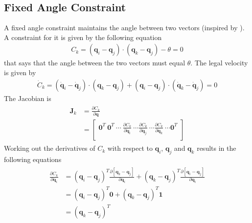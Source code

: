 \subsection{Fixed Angle Constraint}
\label{SubSec:FixedAngleConstraint}
A fixed angle constraint maintains the angle between two vectors (inspired by
\cite{ODEFixedAngle}). A constraint for it is given by the following equation
\begin{eqnarray}
	\label{Eqn:FixedAngleConstraint}
	C_k = (\mathbf{q}_i - \mathbf{q}_j)\cdot(\mathbf{q}_k - \mathbf{q}_j) - \theta = 0
\end{eqnarray}
that says that the angle between the two vectors must equal $\theta$.
The legal velocity is given by
\begin{eqnarray}
	\label{Eqn:FixedAngleConstraintVel}
	\dot{C}_k = (\dot{\mathbf{q}}_i - \dot{\mathbf{q}}_j) \cdot 
                (\mathbf{q}_k - \mathbf{q}_j) +
                (\mathbf{q}_i - \mathbf{q}_j) \cdot
                (\dot{\mathbf{q}}_k - \dot{\mathbf{q}}_j) =
                0
\end{eqnarray}
The Jacobian is
\begin{eqnarray}
	\label{Eqn:JacobianFixedAngleConstraint}    
    \begin{split}
	\mathbf{J}_k & = \frac{\partial C_k}{\partial \mathbf{q}} \\ 
    & = 
	\begin{bmatrix}
		\mathbf{0}^T \: \mathbf{0}^T \: \cdots \: \frac{\partial
		C_k}{\partial \mathbf{q}_i} \: \cdots \frac{\partial
		C_k}{\partial \mathbf{q}_j} \: \cdots \frac{\partial
		C_k}{\partial \mathbf{q}_k} \: \cdots \mathbf{0}^T \\    
	\end{bmatrix}
    \end{split}
\end{eqnarray}
Working out the derivatives of $C_k$ with respect to $\mathbf{q}_i$, $\mathbf{q}_j$ and
$\mathbf{q}_k$ results in the following equations
\begin{eqnarray}
    \begin{split}
    \frac{\partial C_k}{\partial \mathbf{q}_i} & = (\mathbf{q}_i -
    \mathbf{q}_j)^T
    \frac{\partial [\mathbf{q}_k - \mathbf{q}_j]}{\partial \mathbf{q}_i} +
    (\mathbf{q}_k - \mathbf{q}_j)^T
    \frac{\partial [\mathbf{q}_i - \mathbf{q}_j]}{\partial \mathbf{q}_i} \\
    & =
    (\mathbf{q}_i - \mathbf{q}_j)^T \mathbf{0} + (\mathbf{q}_k - \mathbf{q}_j)^T \mathbf{1} \\
    & = 
    (\mathbf{q}_k - \mathbf{q}_j)^T
    \end{split}
\end{eqnarray}

